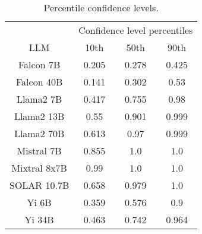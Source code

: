 \begin{table*}
\centering
\begin{tabular}{c|c|c|c}
& \multicolumn{3}{c}{Confidence level percentiles} \\ 
LLM & 10th & 50th & 90th\\ \hline
Falcon 7B & 0.205 & 0.278 & 0.425\\
Falcon 40B & 0.141 & 0.302 & 0.53\\
Llama2 7B & 0.417 & 0.755 & 0.98\\
Llama2 13B & 0.55 & 0.901 & 0.999\\
Llama2 70B & 0.613 & 0.97 & 0.999\\
Mistral 7B & 0.855 & 1.0 & 1.0\\
Mixtral 8x7B & 0.99 & 1.0 & 1.0\\
SOLAR 10.7B & 0.658 & 0.979 & 1.0\\
Yi 6B & 0.359 & 0.576 & 0.9\\
Yi 34B & 0.463 & 0.742 & 0.964\\
\hline
\end{tabular}
\caption{Percentile confidence levels.}
\label{tab:percentile_conf}
\end{table*}
